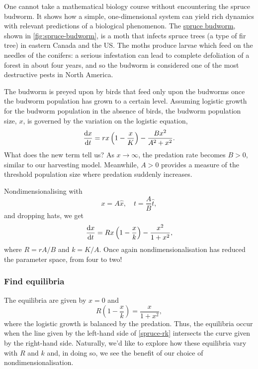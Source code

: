 \documentclass[main.tex]{subfiles}
\begin{document}
One cannot take a mathematical biology course without encountering the spruce budworm. It shows how a simple, one-dimensional system can yield rich dynamics with relevant predictions of a biological phenomenon. The \href{https://en.wikipedia.org/wiki/Choristoneura_fumiferana}{spruce budworm}, shown in \cref{fig:spruce-budworm}, is a moth that infects spruce trees (a type of fir tree) in eastern Canada and the US. The moths produce larvae which feed on the needles of the conifers: a serious infestation can lead to complete defoliation of a forest in about four years, and so the budworm is considered one of the most destructive pests in North America. 

The budworm is preyed upon by birds that feed only upon the budworms once the budworm population has grown to a certain level. Assuming logistic growth for the budworm population in the absence of birds, the budworm population size, $x$, is governed by the variation on the logistic equation,
\begin{equation}
	\fd{x}{t} = rx\left(1-\frac{x}{K}\right) - \frac{Bx^2}{A^2 + x^2}.
\end{equation}
What does the new term tell us? As $x \to \infty$, the predation rate becomes $B > 0$, similar to our harvesting model. Meanwhile, $A > 0$ provides a measure of the threshold population size where predation suddenly increases. 

Nondimensionalising with
\begin{equation}
	x = A \hat{x}, \quad t = \frac{A}{B}\hat{t},
\end{equation}
and dropping hats, we get
\begin{equation}
	\label{budworm-nondim}
	\fd{x}{t} = Rx\left(1-\frac{x}{k}\right) - \frac{x^2}{1+x^2},
\end{equation}
where $R=rA/B$ and $k=K/A$. Once again nondimensionalisation has reduced the parameter space, from four to two!


\subsubsection*{\StepOne Find equilibria}
\vspace{-2mm}
The equilibria are given by $x=0$ and
\begin{equation}
	R\left(1-\frac{x}{k}\right) = \frac{x}{1+x^2},
	\label{spruce-rk}
\end{equation}
where the logistic growth is balanced by the predation. Thus, the equilibria occur when the line given by the left-hand side of \cref{spruce-rk} intersects the curve given by the right-hand side. Naturally, we’d like to explore how these equilibria vary with $R$ and $k$ and, in doing so, we see the benefit of our choice of nondimensionalisation. 
\end{document}
